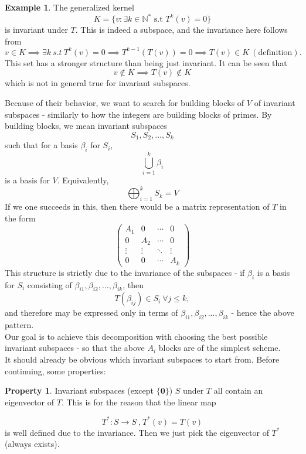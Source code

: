 \documentclass{article}
\theoremstyle{definition}
\newtheorem{example}[theorem]{Example}
\newtheorem{property}[theorem]{Property}
\begin{document}
\begin{example}\label{ex:invariance1}
    The generalized kernel $$K=\{v: \exists k\in \mathbb{N}^* \text{ s.t } T^k(v)=0\}$$
is invariant under $T$. This is indeed a subspace, and the invariance here follows from 
$$v\in K \implies \exists k\ s.t\ T^k(v)=0\implies T^{k-1}(T(v))=0\implies T(v)\in K\ (\text{definition}).$$
This set has a stronger structure than being just invariant. It can be seen that 
\begin{equation}\label{initial}
    v\notin K\implies T(v)\notin K
\end{equation}
which is not in general true for invariant subspaces.
\end{example}
\newpage
Because of their behavior, we want to search for building blocks of $V$ of invariant subspaces - similarly to how the integers are building blocks of primes. By building blocks, we mean invariant subspaces $$S_1,S_2,...,S_k$$such that for a basis $\beta_i$ for $S_i$, $$\bigcup_{i=1}^k \beta_i$$is a basis for $V$. Equivalently, $$\bigoplus_{i=1}^kS_k=V$$If we one succeeds in this, then there would be a matrix representation of $T$ in the form \[
\begin{pmatrix}
A_1 & 0   & \cdots & 0 \\
0   & A_2 & \cdots & 0 \\
\vdots & \vdots & \ddots & \vdots \\
0   & 0   & \cdots & A_k
\end{pmatrix}
\]
This structure is strictly due to the invariance of the subspaces - if $\beta_i$ is a basis for $S_i$ consisting of $\beta_{i1},\beta_{i2},...,\beta_{ik}$, then $$T(\beta_{ij})\in S_i\ \forall j\leq k, $$and therefore may be expressed only in terms of $\beta_{i1},\beta_{i2},...,\beta_{ik}$ - hence the above pattern.\\

Our goal is to achieve this decomposition with choosing the best possible invariant subspaces - so that the above $A_i$ blocks are of the simplest scheme.\\
It should already be obvious which invariant subspaces to start from. Before continuing, some properties:


\begin{property}
Invariant subspaces (except $\{\mathbf{0}\}$) $S$ under $T$ all contain an eigenvector of $T$. This is for the reason that the linear map

 $$T^*:S\rightarrow S\ \text{,} \ T^*(v)=T(v)$$   
is well defined due to the invariance. Then we just pick the eigenvector of $T^*$ (always exists).
    
\end{property}
\end{document}

